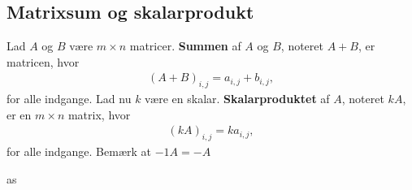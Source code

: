 \subsection{Matrixsum og skalarprodukt}
%
\begin{defn}{}{}
Lad $A$ og $B$ være $m \times n$ matricer.
\textbf{Summen} af $A$ og $B$, noteret $A + B$, er matricen, hvor
\begin{align*}
(A + B)_{i,j} = a_{i,j} + b_{i,j},
\end{align*}
for alle indgange.
Lad nu $k$ være en skalar.
\textbf{Skalarproduktet} af $A$, noteret $kA$, er en $m \times n$ matrix, hvor
\begin{align*}
(kA)_{i,j} = ka_{i,j},
\end{align*}
for alle indgange. Bemærk at $-1A = -A$
\end{defn}
%
\begin{eks}
as
\end{eks}